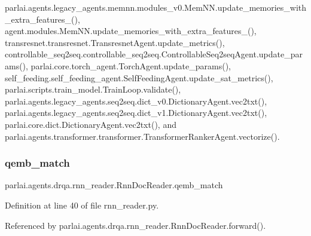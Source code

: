 parlai.\+agents.\+legacy\+\_\+agents.\+memnn.\+modules\+\_\+v0.\+Mem\+N\+N.\+update\+\_\+memories\+\_\+with\+\_\+extra\+\_\+features\+\_\+(), agent.\+modules.\+Mem\+N\+N.\+update\+\_\+memories\+\_\+with\+\_\+extra\+\_\+features\+\_\+(), transresnet.\+transresnet.\+Transresnet\+Agent.\+update\+\_\+metrics(), controllable\+\_\+seq2seq.\+controllable\+\_\+seq2seq.\+Controllable\+Seq2seq\+Agent.\+update\+\_\+params(), parlai.\+core.\+torch\+\_\+agent.\+Torch\+Agent.\+update\+\_\+params(), self\+\_\+feeding.\+self\+\_\+feeding\+\_\+agent.\+Self\+Feeding\+Agent.\+update\+\_\+sat\+\_\+metrics(), parlai.\+scripts.\+train\+\_\+model.\+Train\+Loop.\+validate(), parlai.\+agents.\+legacy\+\_\+agents.\+seq2seq.\+dict\+\_\+v0.\+Dictionary\+Agent.\+vec2txt(), parlai.\+agents.\+legacy\+\_\+agents.\+seq2seq.\+dict\+\_\+v1.\+Dictionary\+Agent.\+vec2txt(), parlai.\+core.\+dict.\+Dictionary\+Agent.\+vec2txt(), and parlai.\+agents.\+transformer.\+transformer.\+Transformer\+Ranker\+Agent.\+vectorize().

\mbox{\label{classparlai_1_1agents_1_1drqa_1_1rnn__reader_1_1RnnDocReader_a2d7bda1b45827ea5864b64a766bb1ce9}} 
\subsubsection{\texorpdfstring{qemb\+\_\+match}{qemb\_match}}
{\footnotesize\ttfamily parlai.\+agents.\+drqa.\+rnn\+\_\+reader.\+Rnn\+Doc\+Reader.\+qemb\+\_\+match}



Definition at line 40 of file rnn\+\_\+reader.\+py.



Referenced by parlai.\+agents.\+drqa.\+rnn\+\_\+reader.\+Rnn\+Doc\+Reader.\+forward().

\mbox{\label{classparlai_1_1agents_1_1drqa_1_1rnn__reader_1_1RnnDocReader_a6e5d5208e7fb45c3227abf28d965146d}} 
